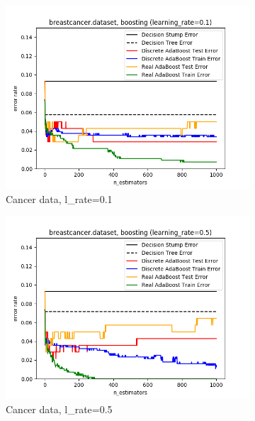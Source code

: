 \documentclass{article}
\begin{document}
\begin{figure}[htb]
    \begin{subfigure}{0.33\textwidth}
      \includegraphics[width=\linewidth]{out/boosting/breastcancer-error-lrate-0.1.png}
      \caption{Cancer data, l\_rate=0.1}
      \label{fig:boosting-param-4}
    \end{subfigure}\hfil
    \begin{subfigure}{0.33\textwidth}
      \includegraphics[width=\linewidth]{out/boosting/breastcancer-error-lrate-0.5.png}
      \caption{Cancer data, l\_rate=0.5}
      \label{fig:boosting-param-5}
    \end{subfigure}\hfil
    \begin{subfigure}{0.33\textwidth}

\end{subfigure}
\end{figure}
\end{document}
